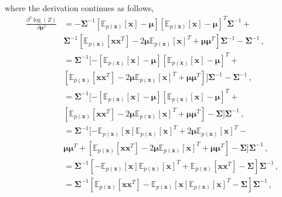 where the derivation continues as follows,
\begin{align}
\frac{\partial^2 \log (Z)}{\partial \boldsymbol{\mu}^2} & = - \boldsymbol{\Sigma}^{-1} [ \mathds{E}_{p(\mathbf{x})}[\mathbf{x}] - \boldsymbol{\mu}  ]  [ \mathds{E}_{p(\mathbf{x})}[\mathbf{x}] - \boldsymbol{\mu}  ]^T \boldsymbol{\Sigma}^{-1} + \nonumber \\ & \boldsymbol{\Sigma}^{-1} [ \mathds{E}_{p(\mathbf{x})}[\mathbf{x}\mathbf{x}^T] - 2 \boldsymbol{\mu} \mathds{E}_{p(\mathbf{x})}[\mathbf{x}]^T  + \boldsymbol{\mu} \boldsymbol{\mu}^T ]  \boldsymbol{\Sigma}^{-1}  - \boldsymbol{\Sigma}^{-1} \nonumber \,, \\
& = \boldsymbol{\Sigma}^{-1} [- [ \mathds{E}_{p(\mathbf{x})}[\mathbf{x}] - \boldsymbol{\mu}  ]  [ \mathds{E}_{p(\mathbf{x})}[\mathbf{x}] - \boldsymbol{\mu}  ]^T + \nonumber \\ & [ \mathds{E}_{p(\mathbf{x})}[\mathbf{x}\mathbf{x}^T] - 2 \boldsymbol{\mu} \mathds{E}_{p(\mathbf{x})}[\mathbf{x}]^T  + \boldsymbol{\mu} \boldsymbol{\mu}^T ] ] \boldsymbol{\Sigma}^{-1} - \boldsymbol{\Sigma}^{-1} \nonumber \,, \\
& = \boldsymbol{\Sigma}^{-1} [- [ \mathds{E}_{p(\mathbf{x})}[\mathbf{x}] - \boldsymbol{\mu}  ]  [ \mathds{E}_{p(\mathbf{x})}[\mathbf{x}] - \boldsymbol{\mu}  ]^T + \nonumber \\ & [ \mathds{E}_{p(\mathbf{x})}[\mathbf{x}\mathbf{x}^T] - 2 \boldsymbol{\mu} \mathds{E}_{p(\mathbf{x})}[\mathbf{x}]^T  + \boldsymbol{\mu} \boldsymbol{\mu}^T ] - \boldsymbol{\Sigma} ] \boldsymbol{\Sigma}^{-1} \nonumber \,, \\
&  = \boldsymbol{\Sigma}^{-1} [ - \mathds{E}_{p(\mathbf{x})}[\mathbf{x}] \mathds{E}_{p(\mathbf{x})}[\mathbf{x}]^T + 2  \boldsymbol{\mu}  \mathds{E}_{p(\mathbf{x})}[\mathbf{x}]^T - \nonumber \\ & \boldsymbol{\mu}\boldsymbol{\mu}^T + [\mathds{E}_{p(\mathbf{x})}[\mathbf{x}\mathbf{x}^T] - 2 \boldsymbol{\mu} \mathds{E}_{p(\mathbf{x})}[\mathbf{x}]^T  + \boldsymbol{\mu} \boldsymbol{\mu}^T ] - \boldsymbol{\Sigma} ] \boldsymbol{\Sigma}^{-1} \nonumber \,, \\
& = \boldsymbol{\Sigma}^{-1} [ - \mathds{E}_{p(\mathbf{x})}[\mathbf{x}] \mathds{E}_{p(\mathbf{x})}[\mathbf{x}]^T + \mathds{E}_{p(\mathbf{x})}[\mathbf{x}\mathbf{x}^T] - \boldsymbol{\Sigma} ] \boldsymbol{\Sigma}^{-1} \nonumber \,, \\
& = \boldsymbol{\Sigma}^{-1} [ \mathds{E}_{p(\mathbf{x})}[\mathbf{x}\mathbf{x}^T] - \mathds{E}_{p(\mathbf{x})}[\mathbf{x}] \mathds{E}_{p(\mathbf{x})}[\mathbf{x}]^T - \boldsymbol{\Sigma} ] \boldsymbol{\Sigma}^{-1} \nonumber \,, \\
\end{align}
